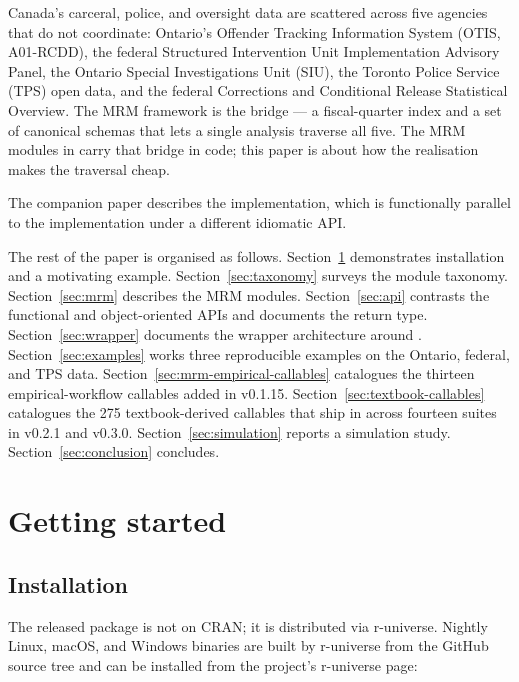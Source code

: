 \documentclass[article,shortnames,nojss]{jss}
\newcommand{\OTIS}{\textsf{OTIS}}
\newcommand{\SIU}{\textsf{SIU}}
\newcommand{\TPS}{\textsf{TPS}}
\begin{document}
Canada's carceral, police, and oversight data are scattered
across five agencies that do not coordinate: Ontario's
Offender Tracking Information System (\OTIS, A01-RCDD), the
federal Structured Intervention Unit Implementation Advisory
Panel, the Ontario Special Investigations Unit (\SIU), the
Toronto Police Service (\TPS) open data, and the federal
Corrections and Conditional Release Statistical Overview. The
MRM framework \citep{Ruhela2026MRM} is the bridge --- a
fiscal-quarter index and a set of canonical schemas that lets
a single analysis traverse all five. The MRM modules in
 carry that bridge in code; this paper is about how
the  realisation makes the traversal cheap.

The companion paper \citep{Ruhela2026MoriePy} describes the
 implementation, which is functionally parallel
to the  implementation under a different idiomatic
API.

The rest of the paper is organised as follows.
Section~\ref{sec:getting-started} demonstrates installation and a
motivating example. Section~\ref{sec:taxonomy} surveys the module
taxonomy. Section~\ref{sec:mrm} describes the MRM modules.
Section~\ref{sec:api} contrasts the functional and
object-oriented APIs and documents the 
return type.  Section~\ref{sec:wrapper} documents the wrapper architecture
around . Section~\ref{sec:examples} works three
reproducible examples on the Ontario, federal, and TPS data.
Section~\ref{sec:mrm-empirical-callables} catalogues the
thirteen empirical-workflow callables added in v0.1.15.
Section~\ref{sec:textbook-callables} catalogues the 275
textbook-derived callables that ship in  across
fourteen suites in v0.2.1 and v0.3.0.
Section~\ref{sec:simulation} reports a simulation study.
Section~\ref{sec:conclusion} concludes.

\section{Getting started}
\label{sec:getting-started}

\subsection{Installation}

The released  package is not on CRAN; it is distributed
via r-universe. Nightly Linux, macOS, and Windows binaries are built
by r-universe \citep{Ooms2021runiverse} from the GitHub source tree
and can be installed from the project's r-universe page:
\end{document}
